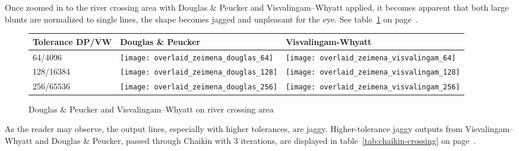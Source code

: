 \documentclass[a4paper]{article}
\newcommand{\DP}{Douglas \& Peucker}
\newcommand{\VW}{Visvalingam--Whyatt}
\begin{document}
Once zoomed in to the river crossing area with {\DP} and {\VW} applied, it
becomes apparent that both large blunts are normalized to single lines, the
shape becomes jagged and unpleasant for the eye. See
table~\ref{tab:comparison-crossing} on page~\pageref{tab:comparison-crossing}.

\begin{figure}[h]
    \renewcommand{\tabularxcolumn}[1]{>{\center\small}m{#1}}
    \begin{tabularx}{\textwidth}{ p{2.1cm} | X | X | }
        Tolerance DP/VW                                                      &
        Douglas \& Peucker                                                   &
        Visvalingam-Whyatt                                                   \tabularnewline \hline

        64/4096                                                              &
        \texttt{[image: overlaid\_zeimena\_douglas\_64]}      &
        \texttt{[image: overlaid\_zeimena\_visvalingam\_64]}  \tabularnewline \hline

        128/16384                                                            &
        \texttt{[image: overlaid\_zeimena\_douglas\_128]}     &
        \texttt{[image: overlaid\_zeimena\_visvalingam\_128]} \tabularnewline \hline

        256/65536                                                            &
        \texttt{[image: overlaid\_zeimena\_douglas\_256]}     &
        \texttt{[image: overlaid\_zeimena\_visvalingam\_256]} \tabularnewline \hline

    \end{tabularx}
    \caption{{\DP} and {\VW} on river crossing area}
    \label{tab:comparison-crossing}
\end{figure}

As the reader may observe, the output lines, especially with higher tolerances,
are jaggy. Higher-tolerance jaggy outputs from {\VW} and {\DP}, passed through
Chaikin with 3 iterations, are displayed in table~\ref{tab:chaikin-crossing} on
page~\pageref{tab:chaikin-crossing}.
\end{document}
